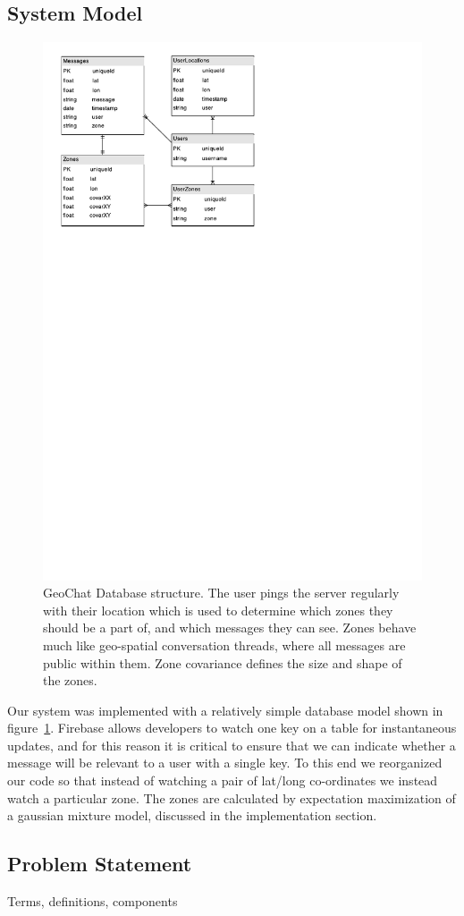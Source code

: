 
\subsection{System Model}
\begin{figure}
\includegraphics{figs/systemModel}
\caption{GeoChat Database structure.  The user pings the server regularly with their location which is used to determine which zones they should be a part of, and which messages they can see.  Zones behave much like geo-spatial conversation threads, where all messages are public within them.  Zone covariance defines the size and shape of the zones.}
\label{systemModel}
\end{figure}

Our system was implemented with a relatively simple database model shown in figure~\ref{systemModel}.  Firebase allows developers to watch one key on a table for instantaneous updates, and for this reason it is critical to ensure that we can indicate whether a message will be relevant to a user with a single key.  To this end we reorganized our code so that instead of watching a pair of lat/long co-ordinates we instead watch a particular zone.  The zones are calculated by expectation maximization of a gaussian mixture model, discussed in the implementation section.

\subsection{Problem Statement}
Terms, definitions, components
